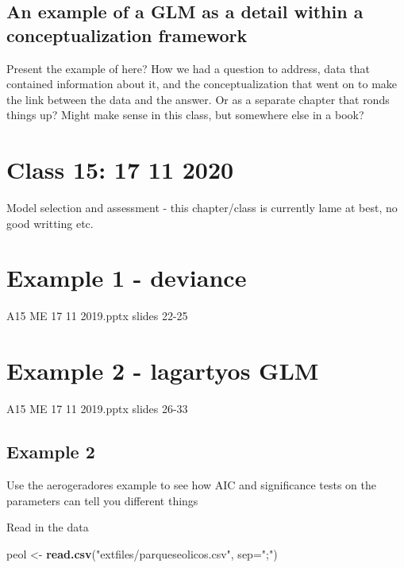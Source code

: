 \documentclass[
]{book}
\newenvironment{Shaded}{\begin{snugshade}}{\end{snugshade}}
\newcommand{\AttributeTok}[1]{\textcolor[rgb]{0.13,0.29,0.53}{#1}}
\newcommand{\FunctionTok}[1]{\textcolor[rgb]{0.13,0.29,0.53}{\textbf{#1}}}
\newcommand{\NormalTok}[1]{#1}
\newcommand{\OtherTok}[1]{\textcolor[rgb]{0.56,0.35,0.01}{#1}}
\newcommand{\StringTok}[1]{\textcolor[rgb]{0.31,0.60,0.02}{#1}}
\begin{document}
\hypertarget{an-example-of-a-glm-as-a-detail-within-a-conceptualization-framework}{%
\section{An example of a GLM as a detail within a conceptualization framework}\label{an-example-of-a-glm-as-a-detail-within-a-conceptualization-framework}}

Present the example of \citet{Filipe2004} here? How we had a question to address, data that contained information about it, and the conceptualization that went on to make the link between the data and the answer. Or as a separate chapter that ronds things up? Might make sense in this class, but somewhere else in a book?

\hypertarget{aula15}{%
\chapter{Class 15: 17 11 2020}\label{aula15}}

Model selection and assessment - this chapter/class
is currently lame at best, no good writting etc.

\hypertarget{example-1---deviance}{%
\chapter{Example 1 - deviance}\label{example-1---deviance}}

A15 ME 17 11 2019.pptx
slides 22-25

\hypertarget{example-2---lagartyos-glm}{%
\chapter{Example 2 - lagartyos GLM}\label{example-2---lagartyos-glm}}

A15 ME 17 11 2019.pptx
slides 26-33

\hypertarget{example-2}{%
\section{Example 2}\label{example-2}}

Use the aerogeradores example to see how AIC and significance tests on the parameters can tell you different things

Read in the data

\begin{Shaded}
\begin{Highlighting}[]
\NormalTok{peol }\OtherTok{\textless{}{-}} \FunctionTok{read.csv}\NormalTok{(}\StringTok{"extfiles/parqueseolicos.csv"}\NormalTok{, }\AttributeTok{sep=}\StringTok{";"}\NormalTok{)}
\end{Highlighting}
\end{Shaded}
\end{document}
